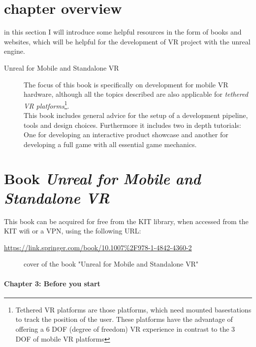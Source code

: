 \section{chapter overview}

in this section I will introduce some helpful resources in the form of books and websites, which will be helpful for the development of VR project with the unreal engine.


\begin{description}
\item[Unreal for Mobile and Standalone VR] The focus of this book is specifically on development for mobile VR hardware, although all the topics described are also applicable for \textit{tethered VR platforms}\footnote{Tethered VR platforms are those platforms, which need mounted basestations to track the position of the user. These platforms have the advantage of offering a 6 DOF (degree of freedom) VR experience in contrast to the 3 DOF of mobile VR  platforms}.\\
This book includes general advice for the setup of a development pipeline, tools and design choices. Furthermore it includes two in depth tutorials: One for developing an interactive product showcase and another for developing a full game with all essential game mechanics.
\end{description}

\section{Book \textit{Unreal for Mobile and Standalone VR}}

This book can be acquired for free from the KIT library\cite{KitBib}, when accessed from the KIT wifi or a VPN, using the following URL:

\url{https://link.springer.com/book/10.1007%2F978-1-4842-4360-2}

\setlength{\fboxsep}{0pt}
\setlength{\fboxrule}{0pt}
\begin{figure}[h]
\centering
{}
\caption[Unreal for Mobile and Standalone VR]{cover of the book "Unreal for Mobile and Standalone VR"}
\label{fig:unrealmobilecover}
\end{figure}

\paragraph{Chapter 3: Before you start}

